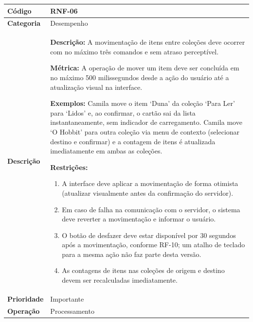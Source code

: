 \FloatBarrier
\begin{quadro}[h!]
\caption{RNF-06 -- Desempenho na Movimentação de Itens}
\label{quad:rnf06}
\begin{tabular}{|p{3.2cm}|p{11.8cm}|}
\hline
\textbf{Código}     & RNF-06 \\ \hline
\textbf{Categoria}  & Desempenho \\ \hline
\textbf{Descrição}  &
\textbf{Descrição:} A movimentação de itens entre coleções deve ocorrer com no máximo três comandos e sem atraso perceptível.

\textbf{Métrica:} A operação de mover um item deve ser concluída em no máximo 500 milissegundos desde a ação do usuário até a atualização visual na interface.

\textbf{Exemplos:} Camila move o item `Duna' da coleção `Para Ler' para `Lidos' e, ao confirmar, o cartão sai da lista instantaneamente, sem indicador de carregamento.
Camila move `O Hobbit' para outra coleção via menu de contexto (selecionar destino e confirmar) e a contagem de itens é atualizada imediatamente em ambas as coleções.

\textbf{Restrições:}
\begin{enumerate}[nosep,leftmargin=1.2em,topsep=2pt,partopsep=0pt,parsep=0pt,itemsep=1pt]
  \item A interface deve aplicar a movimentação de forma otimista (atualizar visualmente antes da confirmação do servidor).
  \item Em caso de falha na comunicação com o servidor, o sistema deve reverter a movimentação e informar o usuário.
  \item O botão de desfazer deve estar disponível por 30 segundos após a movimentação, conforme RF-10; um atalho de teclado para a mesma ação não faz parte desta versão.
  \item As contagens de itens nas coleções de origem e destino devem ser recalculadas imediatamente.
\end{enumerate} \\ \hline
\textbf{Prioridade} & Importante \\ \hline
\textbf{Operação}   & Processamento \\ \hline
\end{tabular}
\end{quadro}

